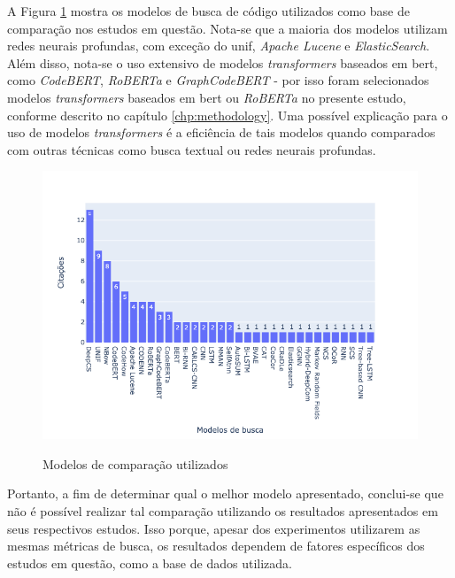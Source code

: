 A Figura \ref{fig:related-baselines} mostra os modelos de busca de código utilizados como base de comparação nos estudos em questão. Nota-se que a maioria dos modelos utilizam redes neurais profundas, com exceção do \gls{unif}, \textit{Apache Lucene} e \textit{ElasticSearch}. Além disso, nota-se o uso extensivo de modelos \textit{transformers} baseados em \gls{bert}, como \textit{CodeBERT}, \textit{RoBERTa} e \textit{GraphCodeBERT} - por isso foram selecionados modelos \textit{transformers} baseados em \gls{bert} ou \textit{RoBERTa} no presente estudo, conforme descrito no capítulo \ref{chp:methodology}. Uma possível explicação para o uso de modelos \textit{transformers} é a eficiência de tais modelos quando comparados com outras técnicas como busca textual ou redes neurais profundas.
\begin{figure}[H]
    \centering
        \caption{Modelos de comparação utilizados}
        \includegraphics[scale=0.5]{./imagens/trabalhos-relacionados/baselines.png}
        \label{fig:related-baselines}
\end{figure}

Portanto, a fim de determinar qual o melhor modelo apresentado, conclui-se que não é possível realizar tal comparação utilizando os resultados apresentados em seus respectivos estudos. Isso porque, apesar dos experimentos utilizarem as mesmas métricas de busca, os resultados dependem de fatores específicos dos estudos em questão, como a base de dados utilizada.

